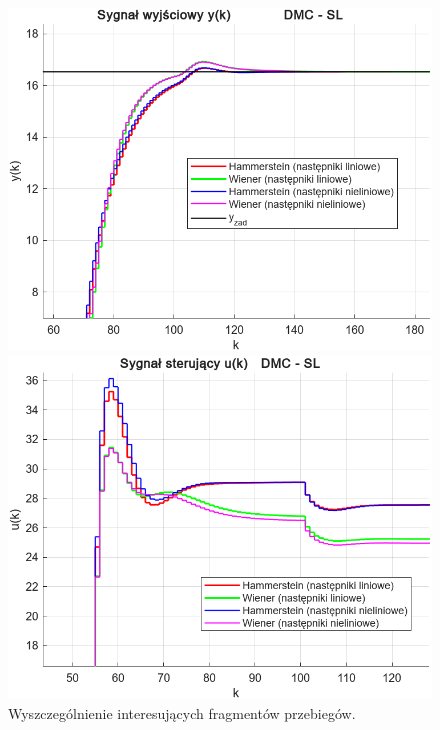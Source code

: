 \documentclass[a4paper,titlepage,11pt,floatssmall]{mwrep}
\begin{document}
\begin{figure}[p]
\begin{minipage}{0.495\linewidth}
    \centering
    \includegraphics[width=\linewidth]{pictures/DMC_sl_y_zoom}
\end{minipage}
\hfill
\begin{minipage}{0.495\linewidth}
    \centering
    \includegraphics[width=\linewidth]{pictures/DMC_sl_u_zoom}
\end{minipage}
\caption{Wyszczególnienie interesujących fragmentów przebiegów.}
\end{figure}

\end{document}
